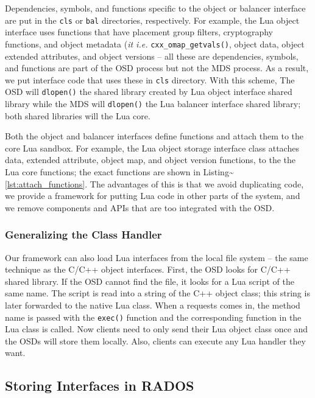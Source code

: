 \documentclass[10pt,twocolumn]{article}
\begin{document}
Dependencies, symbols, and functions specific to the object or balancer
interface are put in the \texttt{cls} or \texttt{bal} directories,
respectively. For example, the Lua object interface uses functions that
have placement group filters, cryptography functions, and object
metadata (\emph{it i.e.} \texttt{cxx\_omap\_getvals()}, object data,
object extended attributes, and object versions -- all these are
dependencies, symbols, and functions are part of the OSD process but not
the MDS process. As a result, we put interface code that uses these in
\texttt{cls} directory. With this scheme, The OSD will \texttt{dlopen()}
the shared library created by Lua object interface shared library while
the MDS will \texttt{dlopen()} the Lua balancer interface shared
library; both shared libraries will the Lua core.

Both the object and balancer interfaces define functions and attach them
to the core Lua sandbox. For example, the Lua object storage interface
class attaches data, extended attribute, object map, and object version
functions, to the the Lua core functions; the exact functions are shown
in Listing\textasciitilde{}\ref{lst:attach_functions}. The advantages of
this is that we avoid duplicating code, we provide a framework for
putting Lua code in other parts of the system, and we remove components
and APIs that are too integrated with the OSD.

\subsubsection{Generalizing the Class
Handler}\label{generalizing-the-class-handler}

Our framework can also load Lua interfaces from the local file system --
the same technique as the C/C++ object interfaces. First, the OSD looks
for C/C++ shared library. If the OSD cannot find the file, it looks for
a Lua script of the same name. The script is read into a string of the
C++ object class; this string is later forwarded to the native Lua
class. When a requests comes in, the method name is passed with the
\texttt{exec()} function and the corresponding function in the Lua class
is called. Now clients need to only send their Lua object class once and
the OSDs will store them locally. Also, clients can execute any Lua
handler they want.

\subsection{Storing Interfaces in
RADOS}\label{storing-interfaces-in-rados}
\end{document}
